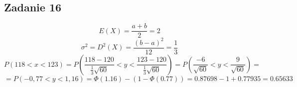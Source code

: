 \subsection{Zadanie 16}
$$E(X)=\frac{a+b}{2}=2$$
$$\sigma^2=D^2(X)=\frac{(b-a)^2}{12}=\frac{1}{3}$$
$$P(118<x<123)=P(\frac{118-120}{\frac{1}{3}\sqrt{60}}<y<\frac{123-120}{\frac{1}{3}\sqrt{60}})=P(\frac{-6}{\sqrt{60}}<y<\frac{9}{\sqrt{60}})=$$
$$=P(-0,77<y<1,16)=\Phi(1.16)-(1-\Phi(0.77))=0.87698-1+0.77935=0.65633$$
